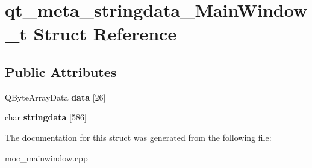 \hypertarget{structqt__meta__stringdata__MainWindow__t}{\section{qt\-\_\-meta\-\_\-stringdata\-\_\-\-Main\-Window\-\_\-t Struct Reference}
\label{structqt__meta__stringdata__MainWindow__t}
}
\subsection*{Public Attributes}
\begin{DoxyCompactItemize}
\item 
\hypertarget{structqt__meta__stringdata__MainWindow__t_a48f255bc47fc5d9f118e582b8447d10a}{Q\-Byte\-Array\-Data {\bfseries data} \mbox{[}26\mbox{]}}\label{structqt__meta__stringdata__MainWindow__t_a48f255bc47fc5d9f118e582b8447d10a}

\item 
\hypertarget{structqt__meta__stringdata__MainWindow__t_a8a8b1caf3c4a7f2c225e54bf6e887a72}{char {\bfseries stringdata} \mbox{[}586\mbox{]}}\label{structqt__meta__stringdata__MainWindow__t_a8a8b1caf3c4a7f2c225e54bf6e887a72}

\end{DoxyCompactItemize}


The documentation for this struct was generated from the following file\-:\begin{DoxyCompactItemize}
\item 
moc\-\_\-mainwindow.\-cpp\end{DoxyCompactItemize}
